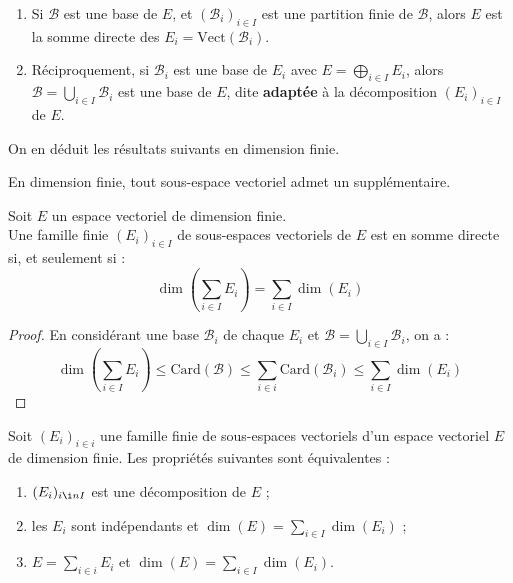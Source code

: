 \documentclass[french]{article}
\newcommand{\card}{\text{Card}}
\newcommand{\Vect}{\text{Vect}}
\theoremstyle{plain}
\theoremstyle{definition}
\theoremstyle{remark}
\begin{document}
\begin{prop}%
	\begin{enumerate}
		\item Si $\mathcal{B}$ est une base de $E$, et $(\mathcal{B}_i)_{i\in I}$ est une partition finie de $\mathcal{B}$, alors $E$ est la somme directe des $E_i=\Vect(\mathcal{B}_i)$.
		\item Réciproquement, si $\mathcal{B}_i$ est une base de $E_i$ avec $E=\displaystyle\bigoplus_{i\in I}E_i$, alors $\mathcal{B}=\displaystyle\bigcup_{i\in I}\mathcal{B}_i$ est une base de $E$, dite \textbf{adaptée} à la décomposition $(E_i)_{i\in I}$ de $E$.
	\end{enumerate}
\end{prop}

On en déduit les résultats suivants en dimension finie.

\begin{cor}%
	En dimension finie, tout sous-espace vectoriel admet un supplémentaire.
\end{cor}

\begin{cor}%
	Soit $E$ un espace vectoriel de dimension finie. \\
	Une famille finie $(E_i)_{i\in I}$ de sous-espaces vectoriels de $E$ est en somme directe si, et seulement si : $$\dim\left(\sum_{i\in I}E_i\right)=\sum_{i\in I}\dim(E_i)$$
\end{cor}
\begin{proof}
	En considérant une base $\mathcal{B}_i$ de chaque $E_i$ et $\mathcal{B}=\displaystyle\bigcup_{i\in I}\mathcal{B}_i$, on a : $$\dim\left(\sum_{i\in I}E_i\right)\leqslant\card(\mathcal{B})\leqslant\sum_{i\in i}\card(\mathcal{B}_i)\leqslant\sum_{i\in I}\dim(E_i)$$
\end{proof}

\begin{cor}%
	Soit $(E_i)_{i\in i}$ une famille finie de sous-espaces vectoriels d'un espace vectoriel $E$ de dimension finie. Les propriétés suivantes sont équivalentes :
	\begin{enumerate}[label=(\roman*)]
		\item $(E_i)_{i\i n I}$ est une décomposition de $E$ ;
		\item les $E_i$ sont indépendants et $\displaystyle\dim(E)=\sum_{i\in I}\dim(E_i)$ ;
		\item $E=\displaystyle\sum_{i\in i}E_i$ et $\displaystyle\dim(E)=\sum_{i\in I}\dim(E_i)$.
	\end{enumerate}
\end{cor}
\end{document}

